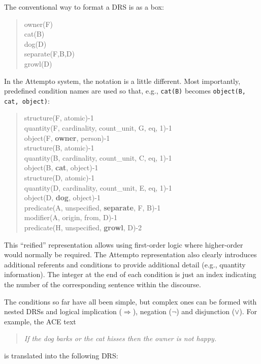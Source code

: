 \documentclass[12pt]{report}
\begin{document}
The conventional way to format a DRS is as a box:
\begin{quote}
{
owner(F)\\
cat(B)\\
dog(D)\\
separate(F,B,D)\\
growl(D)
}
\end{quote}
In the Attempto system, the notation is a little different. Most importantly, predefined condition names are used so that, e.g., \verb|cat(B)| becomes \verb|object(B, cat, object)|:
\begin{quote}
{
structure(F, atomic)-1\\
quantity(F, cardinality, count\_unit, G, eq, 1)-1\\
object(F, \textbf{owner}, person)-1\\
structure(B, atomic)-1\\
quantity(B, cardinality, count\_unit, C, eq, 1)-1\\
object(B, \textbf{cat}, object)-1\\
structure(D, atomic)-1\\
quantity(D, cardinality, count\_unit, E, eq, 1)-1\\
object(D, \textbf{dog}, object)-1\\
predicate(A, unspecified, \textbf{separate}, F, B)-1\\
modifier(A, origin, from, D)-1\\
predicate(H, unspecified, \textbf{growl}, D)-2
}
\end{quote}
This ``reified'' representation allows using first-order logic where higher-order would normally be required. The Attempto representation also clearly introduces additional referents and conditions to provide additional detail (e.g., quantity information). The integer at the end of each condition is just an index indicating the number of the corresponding sentence within the discourse.

The conditions so far have all been simple, but complex ones can be formed with nested DRSs and logical implication ($\Rightarrow$), negation ($\neg$) and disjunction ($\lor$). For example, the ACE text
\begin{quote}
\textit{If the dog barks or the cat hisses then the owner is not happy.}
\end{quote}
is translated into the following DRS:
\end{document}
